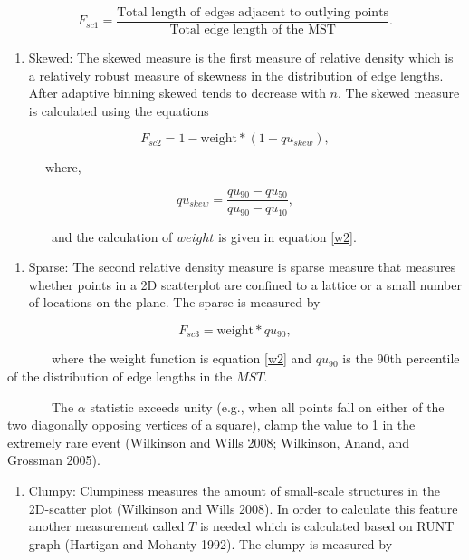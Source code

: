 \documentclass{article}
\begin{document}
\begin{equation}
      F_{sc1} = \frac{\text{Total length of edges adjacent to outlying points}}{\text{Total edge length of the MST}}.
\end{equation}

\begin{enumerate}
\def\labelenumi{\roman{enumi})}
\setcounter{enumi}{1}
\tightlist
\item
  Skewed: The skewed measure is the first measure of relative density
  which is a relatively robust measure of skewness in the distribution
  of edge lengths. After adaptive binning skewed tends to decrease with
  \(n\). The skewed measure is calculated using the equations
\end{enumerate}

\begin{equation}
    F_{sc2} = 1-\text{weight}*(1-qu_{skew}), 
\end{equation}

~~~~~~where,

\begin{equation}
    qu_{skew} = \frac{qu_{90}-qu_{50}}{qu_{90}-qu_{10}}, 
\end{equation}

~~~~~~~and the calculation of \(weight\) is given in equation \ref{w2}.

\begin{enumerate}
\def\labelenumi{\roman{enumi})}
\setcounter{enumi}{2}
\tightlist
\item
  Sparse: The second relative density measure is sparse measure that
  measures whether points in a 2D scatterplot are confined to a lattice
  or a small number of locations on the plane. The sparse is measured by
\end{enumerate}

\begin{equation}
   F_{sc3} = \text{weight} *qu_{90},
\end{equation}

~~~~~~~where the weight function is equation \ref{w2} and \(qu_{90}\) is
the 90th percentile of the distribution of edge lengths in the \(MST\).

~~~~~~~The \(\alpha\) statistic exceeds unity (e.g., when all points
fall on either of the two diagonally opposing vertices of a square),
clamp the value to 1 in the extremely rare event (Wilkinson and Wills
2008; Wilkinson, Anand, and Grossman 2005).

\begin{enumerate}
\def\labelenumi{\roman{enumi})}
\setcounter{enumi}{3}
\tightlist
\item
  Clumpy: Clumpiness measures the amount of small-scale structures in
  the 2D-scatter plot (Wilkinson and Wills 2008). In order to calculate
  this feature another measurement called \(T\) is needed which is
  calculated based on RUNT graph (Hartigan and Mohanty 1992). The clumpy
  is measured by
\end{enumerate}
\end{document}
